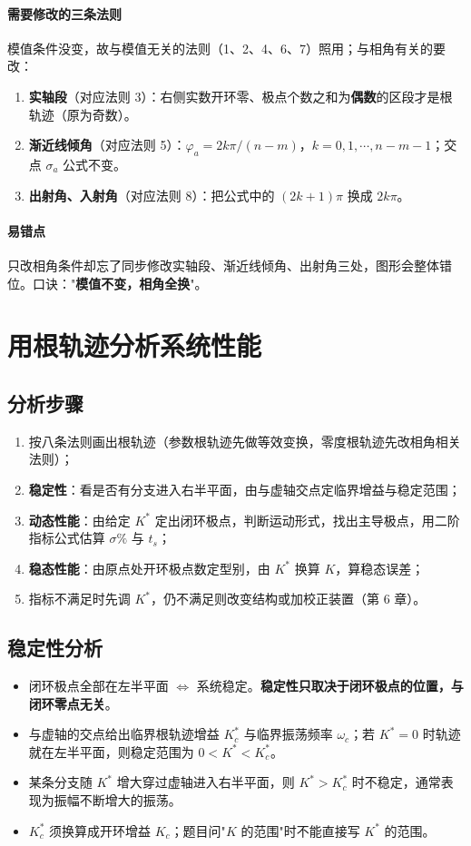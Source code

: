 \paragraph{需要修改的三条法则}模值条件没变，故与模值无关的法则（1、2、4、6、7）照用；与相角有关的要改：
\begin{enumerate}
    \item \textbf{实轴段}（对应法则 3）：右侧实数开环零、极点个数之和为\textbf{偶数}的区段才是根轨迹（原为奇数）。
    \item \textbf{渐近线倾角}（对应法则 5）：$\varphi_a=2k\pi/(n-m)$，$k=0,1,\cdots,n-m-1$；交点 $\sigma_a$ 公式不变。
    \item \textbf{出射角、入射角}（对应法则 8）：把公式中的 $(2k+1)\pi$ 换成 $2k\pi$。
\end{enumerate}

\paragraph{易错点}只改相角条件却忘了同步修改实轴段、渐近线倾角、出射角三处，图形会整体错位。口诀："\textbf{模值不变，相角全换}"。

\medskip

\section{用根轨迹分析系统性能}
\subsection{分析步骤}
\begin{enumerate}
    \item 按八条法则画出根轨迹（参数根轨迹先做等效变换，零度根轨迹先改相角相关法则）；
    \item \textbf{稳定性}：看是否有分支进入右半平面，由与虚轴交点定临界增益与稳定范围；
    \item \textbf{动态性能}：由给定 $K^*$ 定出闭环极点，判断运动形式，找出主导极点，用二阶指标公式估算 $\sigma\%$ 与 $t_s$；
    \item \textbf{稳态性能}：由原点处开环极点数定型别，由 $K^*$ 换算 $K$，算稳态误差；
    \item 指标不满足时先调 $K^*$，仍不满足则改变结构或加校正装置（第 6 章）。
\end{enumerate}

\subsection{稳定性分析}
\begin{itemize}
    \item 闭环极点全部在左半平面 $\Longleftrightarrow$ 系统稳定。\textbf{稳定性只取决于闭环极点的位置，与闭环零点无关}。
    \item 与虚轴的交点给出临界根轨迹增益 $K^*_c$ 与临界振荡频率 $\omega_c$；若 $K^*=0$ 时轨迹就在左半平面，则稳定范围为 $0<K^*<K^*_c$。
    \item 某条分支随 $K^*$ 增大穿过虚轴进入右半平面，则 $K^*>K^*_c$ 时不稳定，通常表现为振幅不断增大的振荡。
    \item $K^*_c$ 须换算成开环增益 $K_c$；题目问"$K$ 的范围"时不能直接写 $K^*$ 的范围。
\end{itemize}

